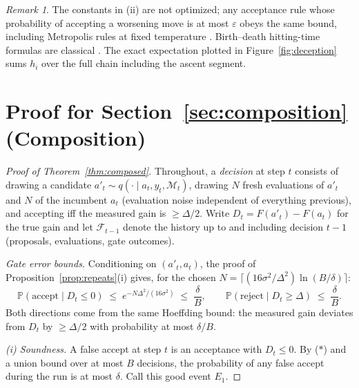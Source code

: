 \documentclass{article}
\theoremstyle{plain}
\theoremstyle{definition}
\theoremstyle{remark}
\newtheorem{remark}[theorem]{Remark}
\newcommand{\M}{\mathcal{M}}
\renewcommand{\P}{\mathbb{P}}
\newcommand{\eps}{\varepsilon}
\begin{document}
\begin{remark}
The constants in (ii) are not optimized; any acceptance rule whose probability of accepting a worsening move is at most $\eps$ obeys the same bound, including Metropolis rules at fixed temperature \citep{kirkpatrick1983optimization}. Birth--death hitting-time formulas are classical \citep{levin2017markov}. The exact expectation plotted in Figure~\ref{fig:deception} sums $h_i$ over the full chain including the ascent segment.
\end{remark}

\section{Proof for Section~\ref{sec:composition} (Composition)}
\label{app:composed}

\begin{proof}[Proof of Theorem~\ref{thm:composed}]
Throughout, a \emph{decision} at step $t$ consists of drawing a candidate $a'_t \sim q(\cdot \mid a_t, y_t, \M_t)$, drawing $N$ fresh evaluations of $a'_t$ and $N$ of the incumbent $a_t$ (evaluation noise independent of everything previous), and accepting iff the measured gain is $\ge \Delta/2$. Write $D_t = F(a'_t) - F(a_t)$ for the true gain and let $\mathcal{F}_{t-1}$ denote the history up to and including decision $t-1$ (proposals, evaluations, gate outcomes).

\emph{Gate error bounds.} Conditioning on $(a'_t, a_t)$, the proof of Proposition~\ref{prop:repeats}(i) gives, for the chosen $N = \lceil (16\sigma^2/\Delta^2)\ln(B/\delta) \rceil$:
\[
\P(\text{accept} \mid D_t \le 0) \;\le\; e^{-N\Delta^2/(16\sigma^2)} \;\le\; \frac{\delta}{B},
\qquad
\P(\text{reject} \mid D_t \ge \Delta) \;\le\; \frac{\delta}{B}.
\tag{$\ast$}
\]
Both directions come from the same Hoeffding bound: the measured gain deviates from $D_t$ by $\ge \Delta/2$ with probability at most $\delta/B$.

\emph{(i) Soundness.} A false accept at step $t$ is an acceptance with $D_t \le 0$. By ($\ast$) and a union bound over at most $B$ decisions, the probability of any false accept during the run is at most $\delta$. Call this good event $E_1$.


\end{proof}
\end{document}
